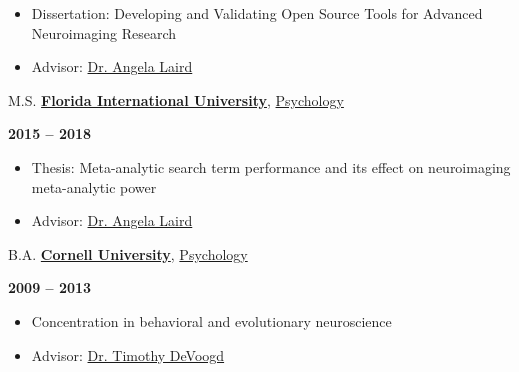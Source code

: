 \documentclass[10pt]{article}
\newcommand{\sectionstyle}{\LARGE \fontfamily{lmr}\selectfont}
\begin{document}
\begin{itemize}[noitemsep, nolistsep]
	\item Dissertation: Developing and Validating Open Source Tools for Advanced Neuroimaging Research

	\item Advisor: \href{https://nbclab.github.io/team/angela-laird}{Dr. Angela Laird}
\end{itemize}

\bigskip

\begin{minipage}[t]{.7\linewidth}
	\flushleft
	\noindent
	M.S.
	\href{https://fiu.edu}{\textbf{Florida International University}},
	\href{https://psychology.fiu.edu}{Psychology}
	\end{minipage}
	\hfill
	\begin{minipage}[t]{.3\linewidth}
	\flushright
	\noindent
	\textsc{\textbf{2015 -- 2018}}
\end{minipage}

\begin{itemize}[noitemsep, nolistsep]
	\item Thesis: Meta-analytic search term performance and its effect on neuroimaging meta-analytic power

	\item Advisor: \href{https://nbclab.github.io/team/angela-laird}{Dr. Angela Laird}
\end{itemize}

\bigskip

\begin{minipage}[t]{.7\linewidth}
	\flushleft
	\noindent
	B.A.
	\href{https://cornell.edu}{\textbf{Cornell University}},
	\href{https://www.psych.cornell.edu}{Psychology}
	\end{minipage}
	\hfill
	\begin{minipage}[t]{.3\linewidth}
	\flushright
	\noindent
	\textsc{\textbf{2009 -- 2013}}
\end{minipage}

\begin{itemize}[noitemsep, nolistsep]
\item
  Concentration in behavioral and evolutionary neuroscience
\item
  Advisor:
	\href{http://www.psych.cornell.edu/people/faculty/devoogd-profile/}
	{Dr. Timothy DeVoogd}
\end{itemize}

\bigskip

\begin{center}\sectionstyle{EXPERIENCE}\end{center}
\end{document}
